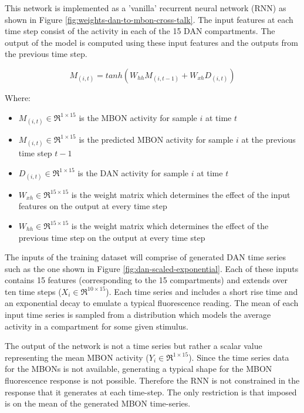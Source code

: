 \documentclass[11pt, A4]{article}
\begin{document}
\begin{multicols}{2}
This network is implemented as a 'vanilla' recurrent neural network (RNN) as shown in Figure \ref{fig:weights-dan-to-mbon-cross-talk}. The input features at each time step consist of the activity in each of the 15 DAN compartments. The output of the model is computed using these input features and the outputs from the previous time step. 

\begin{equation}
M_{(i,t)} = tanh(W_{hh} M_{(i,t-1)} + W_{xh} D_{(i,t)})
\end{equation}

Where:
\begin{itemize}
\item
$M_{(i,t)} \in \Re^{1\times15}$ is the MBON activity for sample $i$ at time $t$
\item
$M_{(i,t)} \in \Re^{1\times15}$ is the predicted MBON activity for sample $i$ at the previous time step $t-1$
\item
$D_{(i,t)} \in \Re^{1\times15}$ is the DAN activity for sample $i$ at time $t$
\item
$W_{xh}\in \Re^{15\times15}$ is the weight matrix which determines the effect of the input features on the output at every time step
\item
$W_{hh}\in \Re^{15\times15}$ is the weight matrix which determines the effect of the previous time step on the output at every time step 
\end{itemize}

The inputs of the training dataset will comprise of generated DAN time series such as the one shown in Figure \ref{fig:dan-scaled-exponential}. Each of these inputs contains 15 features (corresponding to the 15 compartments) and extends over ten time steps ($X_i \in \Re ^{10\times 15}$). Each time series and includes a short rise time and an exponential decay to emulate a typical fluorescence reading. The mean of each input time series is sampled from a distribution which models the average activity in a compartment for some given stimulus. 

The output of the network is not a time series but rather a scalar value representing the mean MBON activity ($Y_i \in \Re ^{1\times 15}$). Since the time series data for the MBONs is not available, generating a typical shape for the MBON fluorescence response is not possible. Therefore the RNN is not constrained in the response that it generates at each time-step. The only restriction is that imposed is on the mean of the generated MBON time-series. 


\end{multicols}
\end{document}
